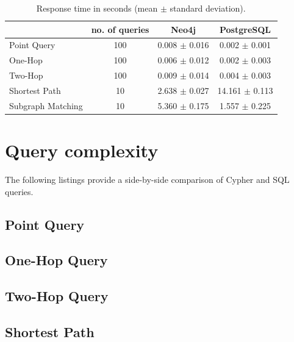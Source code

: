 \documentclass[11pt, a4paper,oneside,chapterprefix=false]{scrbook}
\begin{document}
\begin{table}[h]
	\begin{center}
		\begin{tabular}{ |l|c|c|c| }
			\hline
			& no. of queries & Neo4j & PostgreSQL \\
			\hline
			Point Query & 100 & 0.008 $\pm$ 0.016 & 0.002 $\pm$ 0.001 \\
			One-Hop & 100 & 0.006 $\pm$ 0.012 &  0.002 $\pm$ 0.003 \\
			Two-Hop & 100 & 0.009 $\pm$ 0.014 &  0.004 $\pm$ 0.003 \\
			Shortest Path & 10 & 2.638 $\pm$ 0.027 & 14.161 $\pm$ 0.113 \\
			Subgraph Matching & 10 & 5.360 $\pm$ 0.175 & 1.557 $\pm$ 0.225 \\
			\hline
		\end{tabular}
		\caption{\label{table:performance} Response time in seconds (mean $\pm$ standard deviation).}
	\end{center}
\end{table}

\section{Query complexity}

The following listings provide a side-by-side comparison of Cypher and SQL queries.

\subsection{Point Query} \label{sec:result:point}


\subsection{One-Hop Query}\label{sec:result:one-hop}


\subsection{Two-Hop Query} \label{sec:result:two-hop}


\subsection{Shortest Path} \label{sec:result:shortest-path}

\end{document}
